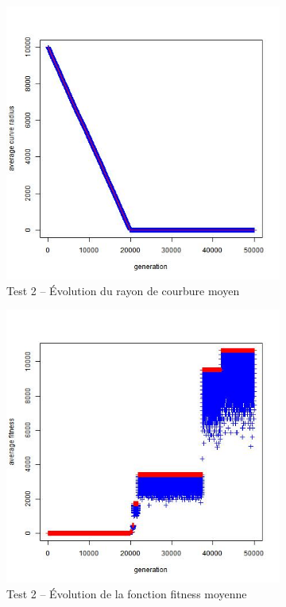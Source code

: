 \documentclass[a4paper,11pt]{article}
\begin{document}
\begin{figure}
\centering
\begin{subfigure}{.5\textwidth}
  \centering
\includegraphics[width=1\linewidth]{1487424485848_evolution_average_curve_radius.jpeg}
\caption{Test 2 – Évolution du rayon de courbure moyen}
\label{fig:sub21}
\end{subfigure}%
\begin{subfigure}{.5\textwidth}
  \centering
\includegraphics[width=1\linewidth]{1487424485848_evolution_average_fitness.jpeg}
\caption{Test 2 – Évolution de la fonction fitness moyenne}
\label{fig:sub22}
\end{subfigure}
\caption{}
\label{fig:test}
\end{figure}
\end{document}
